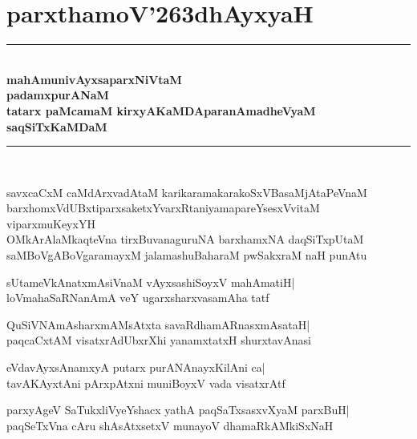 \documentclass[twoside,12pt,openright]{book}
\def\S{\char'263}
\newcounter{shloka}[chapter]
\begin{document}

\frontmatter

\tableofcontents

\mainmatter

\chapter{parxthamoV\S dhAyxyaH}
\begin{center}
\rule{2cm}{1pt}\\[.5cm]
{\large\bfseries mahAmunivAyxsaparxNiVtaM}\\[.3cm]
{\LARGE\bfseries padamxpurANaM}\\[.3cm]
{\Large\bfseries tatarx paMcamaM kirxyAKaMDAparanAmadheVyaM saqSiTxKaMDaM}\\[.3cm]
\rule{2cm}{1pt}\\
\end{center}

\medskip

\begin{shloka}%
savxcaCxM caMdArxvadAtaM karikaramakarakoSxVBasaMjAtaPeVnaM\\
barxhomxVdUBxtiparxsaketxYvarxRtaniyamapareYsesxVvitaM
viparxmuKeyxYH\\
OMkArAlaMkaqteVna tirxBuvanaguruNA barxhamxNA daqSiTxpUtaM\\
saMBoVgABoVgaramayxM jalamashuBaharaM pwSakxraM naH punAtu
\end{shloka}

\begin{shloka}%
sUtameVkAnatxmAsiVnaM vAyxsashiSoyxV mahAmatiH|\\
loVmahaSaRNanAmA veY ugarxsharxvasamAha tatf
\end{shloka}

\begin{shloka}%
QuSiVNAmAsharxmAMsAtxta savaRdhamARnasxmAsataH|\\
paqcaCxtAM visatxrAdUbxrXhi yanamxtatxH shurxtavAnasi
\end{shloka}

\begin{shloka}%
eVdavAyxsAnamxyA putarx purANAnayxKilAni ca|\\
tavAKAyxtAni pArxpAtxni muniBoyxV vada visatxrAtf
\end{shloka}

\begin{shloka}%
parxyAgeV SaTukxliVyeYshacx yathA paqSaTxsasxvXyaM parxBuH|\\
paqSeTxVna cAru shAsAtxsetxV munayoV dhamaRkAMkiSxNaH
\end{shloka}
\end{document}
